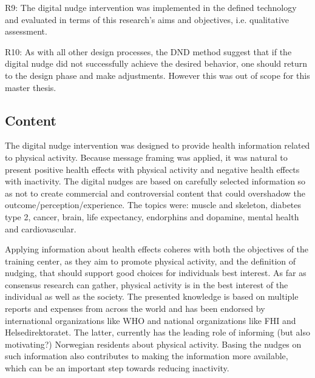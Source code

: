 R9: The digital nudge intervention was implemented in the defined technology and evaluated in terms of this research's aims and objectives, i.e. qualitative assessment. 

R10: As with all other design processes, the DND method suggest that if the digital nudge did not successfully achieve the desired behavior, one should return to the design phase and make adjustments. However this was out of scope for this master thesis. 

\subsection{Content}
The digital nudge intervention was designed to provide health information related to physical activity. Because message framing was applied, it was natural to present positive health effects with physical activity and negative health effects with inactivity. The digital nudges are based on carefully selected information so as not to create commercial and controversial content that could overshadow the outcome/perception/experience. The topics were: muscle and skeleton, diabetes type 2, cancer, brain, life expectancy, endorphins and dopamine, mental health and cardiovascular. 

Applying information about health effects coheres with both the objectives of the training center, as they aim to promote physical activity, and the definition of nudging, that should support good choices for individuals best interest. As far as consensus research can gather, physical activity is in the best interest of the individual as well as the society. The presented knowledge is based on multiple reports and expenses from across the world and has been endorsed by international organizations like WHO and national organizations like FHI and Helsedirektoratet. The latter, currently has the leading role of informing (but also motivating?) Norwegian residents about physical activity. Basing the nudges on such information also contributes to making the information more available, which can be an important step towards reducing inactivity. 

